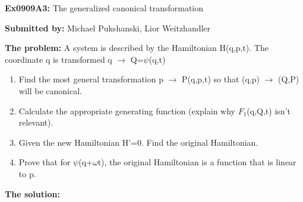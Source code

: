 \documentclass[11pt,fleqn]{article}
\newcommand{\Dn}{\vspace*{3mm}}
\newcommand{\exnumber}[1]{\newcommand{\exnum}{#1}}
\newcommand{\heading}[1]{\begin{center} {\Large {\bf Ex\exnum:} #1} \end{center}}
\newcommand{\auname}[1]{\begin{center} {\bf Submitted by:} #1 \end{center}}
\begin{document}

\exnumber{0909A3}
\heading{The generalized canonical transformation} 
\auname{Michael Pukshanski, Lior Weitzhandler}


{\bf The problem:}
\Dn
A system is described by the Hamiltonian H(q,p,t). The coordinate q is transformed q $\to$ Q=$\psi$(q,t)
\begin{enumerate}
\item Find the most general transformation p $\to$ P(q,p,t) so that (q,p) $\to$ (Q,P) will be canonical.
\item Calculate the appropriate generating function (explain why $F_1$(q,Q,t) isn't relevant).
\item Given the new Hamiltonian H'=0. Find the original Hamiltonian.
\item Prove that for $\psi$(q+$\omega$t), the original Hamiltonian is a function that is linear to p.
\end{enumerate}
\Dn\Dn


{\bf The solution:}
\end{document}
